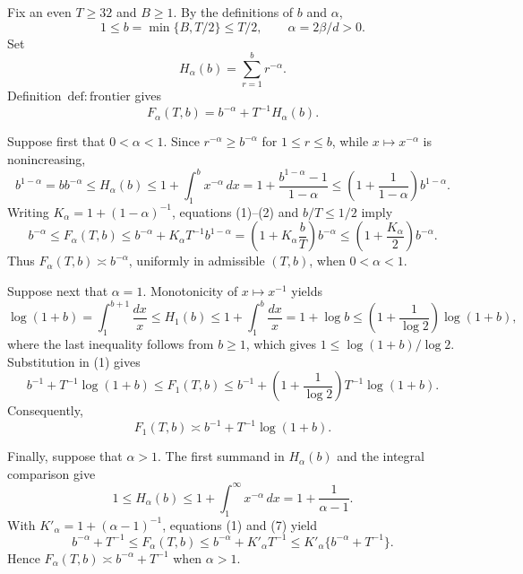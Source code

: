 Fix an even \(T\ge 32\) and \(B\ge 1\).  By the definitions of \(b\) and \(\alpha\),
\[
1\le b=\min\{B,T/2\}\le T/2,
\qquad
\alpha=2\beta/d>0.
\]
Set
\[
H_\alpha(b)=\sum_{r=1}^{b}r^{-\alpha}.
\]
Definition~\(\mathrm{def:frontier}\) gives
\[
F_\alpha(T,b)=b^{-\alpha}+T^{-1}H_\alpha(b). \tag{1}
\]

Suppose first that \(0<\alpha<1\).  Since \(r^{-\alpha}\ge b^{-\alpha}\) for \(1\le r\le b\), while \(x\mapsto x^{-\alpha}\) is nonincreasing,
\[
b^{1-\alpha}=b b^{-\alpha}
\le H_\alpha(b)
\le 1+\int_1^b x^{-\alpha}\,dx
=1+\frac{b^{1-\alpha}-1}{1-\alpha}
\le \left(1+\frac{1}{1-\alpha}\right)b^{1-\alpha}. \tag{2}
\]
Writing \(K_\alpha=1+(1-\alpha)^{-1}\), equations (1)--(2) and \(b/T\le 1/2\) imply
\[
b^{-\alpha}
\le F_\alpha(T,b)
\le b^{-\alpha}+K_\alpha T^{-1}b^{1-\alpha}
=\left(1+K_\alpha\frac bT\right)b^{-\alpha}
\le \left(1+\frac{K_\alpha}{2}\right)b^{-\alpha}. \tag{3}
\]
Thus \(F_\alpha(T,b)\asymp b^{-\alpha}\), uniformly in admissible \((T,b)\), when \(0<\alpha<1\).

Suppose next that \(\alpha=1\).  Monotonicity of \(x\mapsto x^{-1}\) yields
\[
\log(1+b)=\int_1^{b+1}\frac{dx}{x}
\le H_1(b)
\le 1+\int_1^b\frac{dx}{x}
=1+\log b
\le \left(1+\frac{1}{\log 2}\right)\log(1+b), \tag{4}
\]
where the last inequality follows from \(b\ge1\), which gives \(1\le \log(1+b)/\log 2\).  Substitution in (1) gives
\[
b^{-1}+T^{-1}\log(1+b)
\le F_1(T,b)
\le b^{-1}+\left(1+\frac{1}{\log 2}\right)T^{-1}\log(1+b). \tag{5}
\]
Consequently,
\[
F_1(T,b)\asymp b^{-1}+T^{-1}\log(1+b). \tag{6}
\]

Finally, suppose that \(\alpha>1\).  The first summand in \(H_\alpha(b)\) and the integral comparison give
\[
1\le H_\alpha(b)
\le 1+\int_1^\infty x^{-\alpha}\,dx
=1+\frac{1}{\alpha-1}. \tag{7}
\]
With \(K'_\alpha=1+(\alpha-1)^{-1}\), equations (1) and (7) yield
\[
b^{-\alpha}+T^{-1}
\le F_\alpha(T,b)
\le b^{-\alpha}+K'_\alpha T^{-1}
\le K'_\alpha\{b^{-\alpha}+T^{-1}\}. \tag{8}
\]
Hence \(F_\alpha(T,b)\asymp b^{-\alpha}+T^{-1}\) when \(\alpha>1\).

